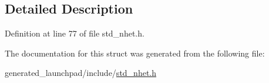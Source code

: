 \subsection{Detailed Description}


Definition at line 77 of file std\+\_\+nhet.\+h.



The documentation for this struct was generated from the following file\+:\begin{DoxyCompactItemize}
\item 
generated\+\_\+launchpad/include/\mbox{\hyperlink{std__nhet_8h}{std\+\_\+nhet.\+h}}\end{DoxyCompactItemize}

